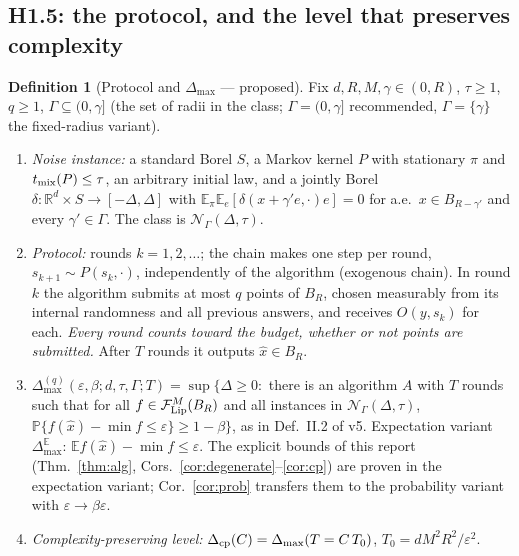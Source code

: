 \documentclass[11pt,a4paper]{article}
\numberwithin{equation}{section}
\theoremstyle{definition}
\newtheorem{definition}[theorem]{Definition}
\theoremstyle{remark}
\newcommand{\E}{\mathbb E}\newcommand{\R}{\mathbb R}\newcommand{\N}{\mathbb N}\newcommand{\Prob}{\mathbb P}
\newcommand{\Dmax}{\Delta_{\max}}\newcommand{\Dcp}{\Delta_{\rm cp}}
\newcommand{\cN}{\mathcal N}\newcommand{\cG}{\mathcal G}\newcommand{\cF}{\mathcal F}\newcommand{\cS}{\mathcal S}
\begin{document}
\subsection{H1.5: the protocol, and the level that preserves complexity}
\begin{definition}[Protocol and $\Dmax$ --- proposed]\label{def:dmax}
Fix $d,R,M,\gamma\in(0,R)$, $\tau\ge1$, $q\ge1$, $\Gamma\subseteq(0,\gamma]$ (the set of radii in the class; $\Gamma=(0,\gamma]$ recommended, $\Gamma=\{\gamma\}$ the fixed-radius variant).
\begin{enumerate}[label=(\roman*)]
\item \emph{Noise instance:} a standard Borel $S$, a Markov kernel $P$ with stationary $\pi$ and $t_{\rm mix}(P)\le\tau$, an arbitrary initial law, and a jointly Borel $\delta:\R^d\times S\to[-\Delta,\Delta]$ with $\E_\pi\E_e[\delta(x+\gamma'e,\cdot)e]=0$ for a.e.\ $x\in B_{R-\gamma'}$ and every $\gamma'\in\Gamma$. The class is $\cN_\Gamma(\Delta,\tau)$.
\item \emph{Protocol:} rounds $k=1,2,\dots$; the chain makes one step per round, $s_{k+1}\sim P(s_k,\cdot)$, independently of the algorithm (exogenous chain). In round $k$ the algorithm submits at most $q$ points of $B_R$, chosen measurably from its internal randomness and all previous answers, and receives $O(y,s_k)$ for each. \emph{Every round counts toward the budget, whether or not points are submitted.} After $T$ rounds it outputs $\hat x\in B_R$.
\item $\Dmax^{(q)}(\varepsilon,\beta;d,\tau,\Gamma;T)=\sup\big\{\Delta\ge0:$ there is an algorithm $A$ with $T$ rounds such that for all $f\in\cF^M_{\rm Lip}(B_R)$ and all instances in $\cN_\Gamma(\Delta,\tau)$, $\Prob\{f(\hat x)-\min f\le\varepsilon\}\ge1-\beta\big\}$, as in Def.~II.2 of v5. Expectation variant $\Dmax^{\E}$: $\E f(\hat x)-\min f\le\varepsilon$. The explicit bounds of this report (Thm.~\ref{thm:alg}, Cors.~\ref{cor:degenerate}--\ref{cor:cp}) are proven in the expectation variant; Cor.~\ref{cor:prob} transfers them to the probability variant with $\varepsilon\to\beta\varepsilon$.
\item \emph{Complexity-preserving level:} $\Dcp(C)=\Dmax(T=C\,T_0)$, $T_0=dM^2R^2/\varepsilon^2$.
\end{enumerate}
\end{definition}
\end{document}
